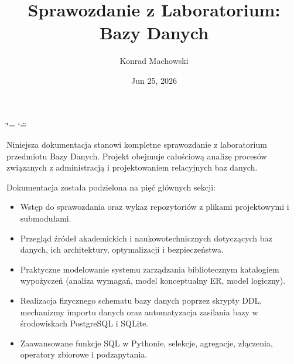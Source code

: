 \documentclass[a4paper,11pt,english,openany,oneside]{sphinxmanual}
\title{Sprawozdanie z Laboratorium: Bazy Danych}
\date{Jun 25, 2026}
\author{Konrad Machowski}
\begin{document}
\ifdefined\shorthandoff
  \ifnum\catcode`\=\string=\active\shorthandoff{=}\fi
  \ifnum\catcode`\"=\active{}\fi
\fi

\pagestyle{empty}
\sphinxmaketitle
\pagestyle{plain}
\sphinxtableofcontents
\pagestyle{normal}
\label{\detokenize{index::doc}}


\sphinxAtStartPar
Niniejsza dokumentacja stanowi kompletne sprawozdanie z laboratorium przedmiotu Bazy Danych. Projekt obejmuje całościową analizę procesów związanych z administracją i projektowaniem relacyjnych baz danych.

\sphinxAtStartPar
Dokumentacja została podzielona na pięć głównych sekcji:
\begin{itemize}
\item {} 
\sphinxAtStartPar
{} Wstęp do sprawozdania oraz wykaz repozytoriów z plikami projektowymi i submodułami.

\item {} 
\sphinxAtStartPar
{} Przegląd źródeł akademickich i naukowo\sphinxhyphen{}technicznych dotyczących baz danych, ich architektury, optymalizacji i bezpieczeństwa.

\item {} 
\sphinxAtStartPar
{} Praktyczne modelowanie systemu zarządzania bibliotecznym katalogiem wypożyczeń (analiza wymagań, model konceptualny E\sphinxhyphen{}R, model logiczny).

\item {} 
\sphinxAtStartPar
{} Realizacja fizycznego schematu bazy danych poprzez skrypty DDL, mechanizmy importu danych oraz automatyzacja zasilania bazy w środowiskach PostgreSQL i SQLite.

\item {} 
\sphinxAtStartPar
{} Zaawansowane funkcje SQL w Pythonie, selekcje, agregacje, złączenia, operatory zbiorowe i podzapytania.

\end{itemize}

\sphinxstepscope
\end{document}
